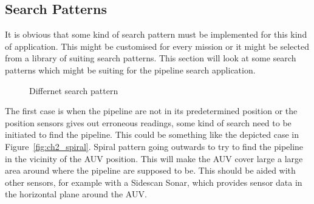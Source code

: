 	\subsection{Search Patterns}
		\label{subsec:ch2_searchpattern}
		It is obvious that some kind of search pattern must be implemented for this kind of
		application. This might be customised for every mission or it might be selected from a library
		of suiting search patterns. 
		This section will look at some search patterns which might be suiting for the pipeline search
		application.

		\begin{figure}[htbp]
			\centering
			 \quad
			\caption{Differnet search pattern}
			\label{fig:ch2_searchpattern}
		\end{figure}
		The first case is when the pipeline are not in its predetermined position or the position
		sensors gives out erroneous readings, some kind of search need to be initiated to find the
		pipeline. This could be something like the depicted case in Figure~\ref{fig:ch2_spiral}.
		Spiral pattern going outwards to try to find the pipeline in the vicinity of the AUV position. This
		will make the AUV cover large a large area around where the pipeline are supposed to be.
		This should be aided with other sensors, for example with a Sidescan Sonar, which provides
		sensor data in the horizontal plane around the AUV.


